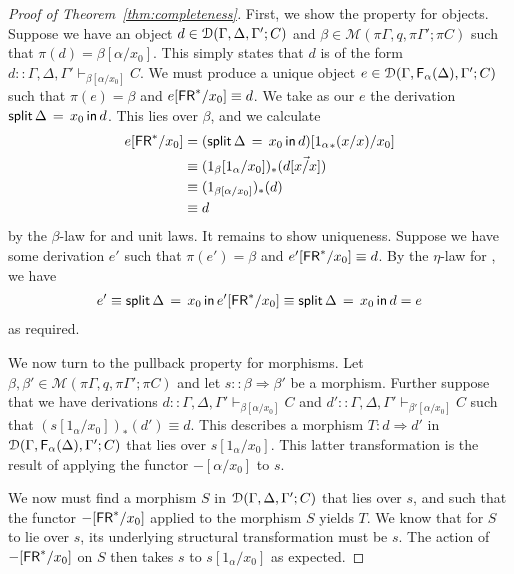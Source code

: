 \documentclass[a4paper,USenglish,numberwithinsect]{lipics-v2016}
\newcommand\D{\ensuremath{d}} %
\newcommand\deq{\ensuremath{\equiv}}
\newcommand\spr{\ensuremath{\Rightarrow}} %
\newcommand\seq[3]{\ensuremath{#1 \vdash_{#2} #3}}
\newcommand\F[2]{\ensuremath{\dsd{F}_{#1}(#2)}}
\newcommand\FR{\dsd{FR}}
\def\M{\mathcal{M}}
\newcommand\FLd[3]{\ensuremath{\dsd{split} \, #2 \, = \, {#1} \, \dsd{in} \, #3}}
\newcommand\FRd[3]{\ensuremath{\Trd{#2}{#3}}}
\newcommand\Trd[2]{\ensuremath{#1_*(#2)}}
\newcommand\Ident[1]{\ensuremath{{#1}}}
\newcommand\Cut[3]{\ensuremath{#1[#2/#3]}}
\newcommand\FRs{\ensuremath{\FR^*}}
\begin{document}
\begin{proof}[Proof of Theorem~\ref{thm:completeness}]
First, we show the property for objects. Suppose we have an object $d
\in \mathcal{D}(\Gamma,\Delta,\Gamma';C)$ and $\beta \in \M(\pi \Gamma, q,\pi
\Gamma'; \pi C)$ such that $\pi(d) = \Cut{\beta}{\alpha}{x_0}$. This
simply states that $d$ is of the form $d :: \seq{\Gamma, \Delta,
  \Gamma'}{\Cut{\beta}{\alpha}{x_0}}{C}$. We must produce a unique
object $e \in \cD(\Gamma,\F{\alpha}{\Delta},\Gamma';C)$ such that
$\pi(e) = \beta$ and $\Cut{e}{\FR^*}{x_0} \deq d$.
We take as our $e$ the derivation $\FLd{x_0}{\Delta}{\D}$. This lies over $\beta$, and we calculate
\begin{align*}
\Cut{e}{\FR^*}{x_0} &= \Cut{(\FLd{x_0}{\Delta}{\D})}{\FRd{\vec{x/x}}{{1_\alpha}}{\Ident{x}/x}}{x_0} \\
&\deq \Trd{(1_\beta[1_\alpha/x_0])}{\D[\vec{\Ident{x}/x}]}\\
&\deq \Trd{(1_{\beta[\alpha/x_0]})}{\D}\\
&\deq \D
\end{align*}
by the $\beta$-law for  and unit laws. 
It remains to show uniqueness. Suppose we have some derivation $e'$ such
that $\pi(e') = \beta$ and $\Cut{e'}{\FR^*}{x_0} \deq d$. By the
$\eta$-law for , we have
\begin{align*}
e' \deq \FLd{x_0}{\Delta}{\Cut{e'}{\FRs}{x_0}} \deq \FLd{x_0}{\Delta}{d} = e
\end{align*}
as required.

We now turn to the pullback property for morphisms. Let $\beta, \beta'
\in \M(\pi\Gamma, q, \pi\Gamma'; \pi C)$ and let $s :: \beta \spr
\beta'$ be a morphism. Further suppose that we have derivations $d ::
\seq{\Gamma, \Delta, \Gamma'}{\Cut{\beta}{\alpha}{x_0}}{C}$ and $d' ::
\seq{\Gamma, \Delta, \Gamma'}{\Cut{\beta'}{\alpha}{x_0}}{C}$ such that
$(\Cut{s}{1_\alpha}{x_0})_*(d') \deq d$. This describes a morphism $T :
d \spr d'$ in $\cD(\Gamma,\F{\alpha}{\Delta},\Gamma';C)$ that lies over
$\Cut{s}{1_\alpha}{x_0}$. This latter transformation is the result of
applying the functor $\Cut{-}{\alpha}{x_0}$ to $s$.

We now must find a morphism $S$ in $\mathcal{D}(\Gamma,\Delta,\Gamma';C)$ that
lies over $s$, and such that the functor $\Cut{-}{\FR^*}{x_0}$ applied
to the morphism $S$ yields $T$. We know that for $S$ to lie over $s$,
its underlying structural transformation must be $s$. The action of
$\Cut{-}{\FR^*}{x_0}$ on $S$ then takes $s$ to $\Cut{s}{1_\alpha}{x_0}$
as expected.


\end{proof}
\end{document}
